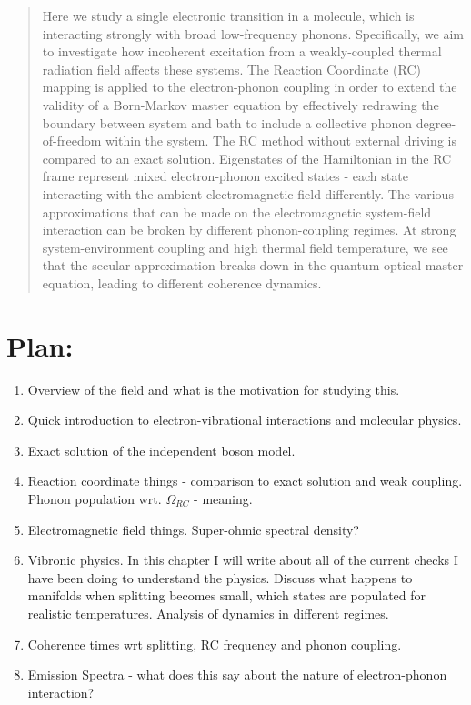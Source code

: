 \documentclass[]{article}
\begin{document}
\maketitle
\begin{abstract}
Here we study a single electronic transition in a molecule, which is interacting strongly with broad low-frequency phonons. Specifically, we aim to investigate how incoherent excitation from a weakly-coupled thermal radiation field affects these systems. The Reaction Coordinate (RC) mapping is applied to the electron-phonon coupling in order to extend the validity of a Born-Markov master equation by effectively redrawing the boundary between system and bath to include a collective phonon degree-of-freedom within the system. The RC method without external driving is compared to an exact solution. Eigenstates of the Hamiltonian in the RC frame represent mixed electron-phonon excited states - each state interacting with the ambient electromagnetic field differently. The various approximations that can be made on the electromagnetic system-field interaction can be broken by different phonon-coupling regimes. At strong system-environment coupling and high thermal field temperature, we see that the secular approximation breaks down in the quantum optical master equation, leading to different coherence dynamics.
\end{abstract}

\section{Plan:}
\begin{enumerate}
	\item Overview of the field and what is the motivation for studying this.
	\item Quick introduction to electron-vibrational interactions and molecular physics.
	\item Exact solution of the independent boson model.
	\item Reaction coordinate things - comparison to exact solution and weak coupling. Phonon population wrt. $\Omega_{RC}$ - meaning.
	\item Electromagnetic field things. Super-ohmic spectral density?
	\item Vibronic physics. In this chapter I will write about all of the current checks I have been doing to understand the physics. Discuss what happens to manifolds when splitting becomes small, which states are populated for realistic temperatures. Analysis of dynamics in different regimes.
	\item Coherence times wrt splitting, RC frequency and phonon coupling.
	\item Emission Spectra - what does this say about the nature of electron-phonon interaction?
\end{enumerate}
\end{document}

